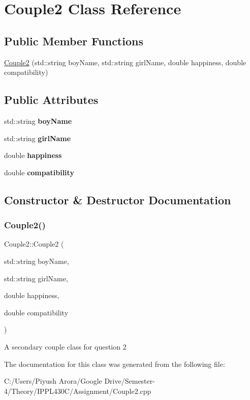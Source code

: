 \hypertarget{class_couple2}{}\section{Couple2 Class Reference}
\label{class_couple2}
\subsection*{Public Member Functions}
\begin{DoxyCompactItemize}
\item 
\hyperlink{class_couple2_a7ab5ff7134198063680988da0f2b495d}{Couple2} (std\+::string boy\+Name, std\+::string girl\+Name, double happiness, double compatibility)
\end{DoxyCompactItemize}
\subsection*{Public Attributes}
\begin{DoxyCompactItemize}
\item 
\mbox{\label{class_couple2_a3d9601d6922c81654c91f7f2b05118f9}} 
std\+::string {\bfseries boy\+Name}
\item 
\mbox{\label{class_couple2_a329e8abcddcdf7e47052fee5f25bb79f}} 
std\+::string {\bfseries girl\+Name}
\item 
\mbox{\label{class_couple2_ada1ad8caf57d6458a6774240095fe622}} 
double {\bfseries happiness}
\item 
\mbox{\label{class_couple2_a4d86bd15a67f44264d26de28edb2aaf3}} 
double {\bfseries compatibility}
\end{DoxyCompactItemize}


\subsection{Constructor \& Destructor Documentation}
\mbox{\label{class_couple2_a7ab5ff7134198063680988da0f2b495d}} 
\subsubsection{\texorpdfstring{Couple2()}{Couple2()}}
{\footnotesize\ttfamily Couple2\+::\+Couple2 (\begin{DoxyParamCaption}\item[{std\+::string}]{boy\+Name,  }\item[{std\+::string}]{girl\+Name,  }\item[{double}]{happiness,  }\item[{double}]{compatibility }\end{DoxyParamCaption})}

A secondary couple class for question 2 

The documentation for this class was generated from the following file\+:\begin{DoxyCompactItemize}
\item 
C\+:/\+Users/\+Piyush Arora/\+Google Drive/\+Semester-\/4/\+Theory/\+I\+P\+P\+L430\+C/\+Assignment/Couple2.\+cpp\end{DoxyCompactItemize}
